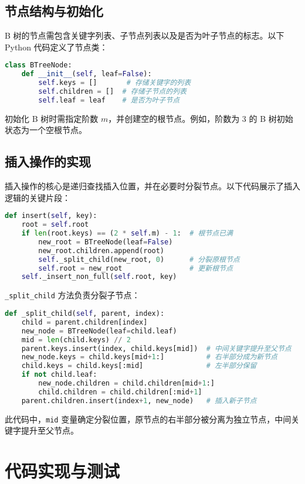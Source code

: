 \section{节点结构与初始化}
B 树的节点需包含关键字列表、子节点列表以及是否为叶子节点的标志。以下 Python 代码定义了节点类：\par
\begin{lstlisting}[language=python]
class BTreeNode:
    def __init__(self, leaf=False):
        self.keys = []       # 存储关键字的列表
        self.children = []  # 存储子节点的列表
        self.leaf = leaf    # 是否为叶子节点
\end{lstlisting}
初始化 B 树时需指定阶数 $m$，并创建空的根节点。例如，阶数为 3 的 B 树初始状态为一个空根节点。\par
\section{插入操作的实现}
插入操作的核心是递归查找插入位置，并在必要时分裂节点。以下代码展示了插入逻辑的关键片段：\par
\begin{lstlisting}[language=python]
def insert(self, key):
    root = self.root
    if len(root.keys) == (2 * self.m) - 1:  # 根节点已满
        new_root = BTreeNode(leaf=False)
        new_root.children.append(root)
        self._split_child(new_root, 0)      # 分裂原根节点
        self.root = new_root                # 更新根节点
    self._insert_non_full(self.root, key)
\end{lstlisting}
\verb!_split_child! 方法负责分裂子节点：\par
\begin{lstlisting}[language=python]
def _split_child(self, parent, index):
    child = parent.children[index]
    new_node = BTreeNode(leaf=child.leaf)
    mid = len(child.keys) // 2
    parent.keys.insert(index, child.keys[mid])  # 中间关键字提升至父节点
    new_node.keys = child.keys[mid+1:]          # 右半部分成为新节点
    child.keys = child.keys[:mid]               # 左半部分保留
    if not child.leaf:
        new_node.children = child.children[mid+1:]
        child.children = child.children[:mid+1]
    parent.children.insert(index+1, new_node)   # 插入新子节点
\end{lstlisting}
此代码中，\verb!mid! 变量确定分裂位置，原节点的右半部分被分离为独立节点，中间关键字提升至父节点。\par
\chapter{代码实现与测试}
